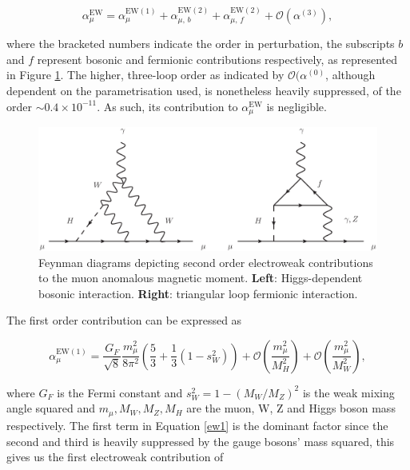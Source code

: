 \documentclass{article}
\numberwithin{equation}{section} %
\begin{document}
\begin{equation}
\alpha_\mu^\mathrm{EW} = \alpha_\mu^\mathrm{EW(1)}+\alpha_{\mu,\,b}^\mathrm{EW(2)}+\alpha_{\mu,\,f}^\mathrm{EW(2)} + \mathcal{O}(\alpha^{(3)}),
\end{equation}

\noindent where the bracketed numbers indicate the order in perturbation, the subscripts $b$ and $f$ represent bosonic and fermionic contributions respectively, as represented in Figure \ref{ewfeynman}. The higher, three-loop order as indicated by $\mathcal{O}(\alpha^{(0)}$, although dependent on the parametrisation used, is nonetheless heavily suppressed, of the order $\sim 0.4\times 10^{-11}$\cite{gnendiger}. As such, its contribution to $\alpha_\mu^\mathrm{EW}$ is negligible.

\begin{figure}[t]
    \centering
    \includegraphics[width=12cm]{ew1.eps}%
    \caption{Feynman diagrams depicting second order electroweak contributions to the muon anomalous magnetic moment. \textbf{Left}: Higgs-dependent bosonic interaction. \textbf{Right}: triangular loop fermionic interaction.}%
    \label{ewfeynman}%
\end{figure}

The first order contribution can be expressed as

\begin{equation}
\alpha_\mu^\mathrm{EW(1)} = \frac{G_F}{\sqrt{8}}\frac{m_\mu^2}{8\pi^2}\left(\frac{5}{3} + \frac{1}{3}(1-s_W^2)\right)+\mathcal{O}\left(\frac{m_\mu^2}{M_H^2}\right) +\mathcal{O}\left(\frac{m_\mu^2}{M_W^2}\right),
\label{ew1}
\end{equation}

\noindent where $G_F$ is the Fermi constant and $s_W^2=1-(M_W/M_Z)^2$ is the weak mixing angle squared and $m_\mu, M_W, M_Z, M_H$ are the muon, W, Z and Higgs boson mass respectively. The first term in Equation \ref{ew1} is the dominant factor since the second and third is heavily suppressed by the gauge bosons' mass squared, this gives us the first electroweak contribution of\cite{gnendiger}
\end{document}
